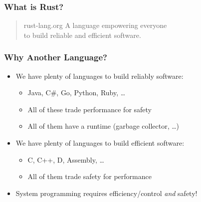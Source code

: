 \begin{frame}
    \frametitle{What is Rust?}

    \begin{quote}{rust-lang.org}
    \centering
        A language empowering everyone\\
        to build reliable and efficient software.
    \end{quote}
\end{frame}

\begin{frame}
    \frametitle{Why Another Language?}

    \begin{itemize}
        \item We have plenty of languages to build reliably software:
        \begin{itemize}
            \item Java, C\#, Go, Python, Ruby, \dots
            \item All of these trade performance for safety
            \item All of them have a runtime (garbage collector, \dots)
        \end{itemize}

        \pause

        \item We have plenty of languages to build efficient software:
        \begin{itemize}
            \item C, C++, D, Assembly, \dots
            \item All of them trade safety for performance
        \end{itemize}

        \pause

        \item System programming requires efficiency/control \emph{and} safety!
    \end{itemize}
\end{frame}

